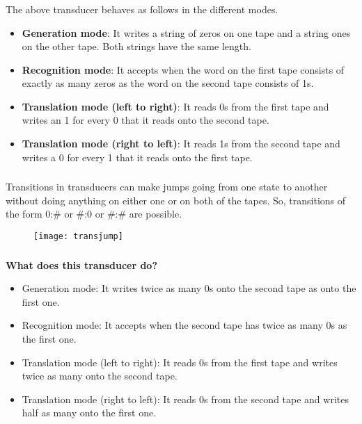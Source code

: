 \begin{frame}

	\frametitle{\insertsection}
	\framesubtitle{\insertsubsection}
	
	The above transducer behaves as follows in the different modes.
	
	\begin{itemize}
		\item \textbf{Generation mode}: It writes a string of zeros on one tape and a string ones on the other tape. Both strings have the same length.
		\item \textbf{Recognition mode}: It accepts when the word on the first tape consists of exactly as many zeros as the word on the second tape consists of 1s.
		\item \textbf{Translation mode (left to right)}: It reads 0s from the first tape and writes an 1 for every 0 that it reads onto the second tape.
		\item \textbf{Translation mode (right to left)}: It reads 1s from the second tape and writes a 0 for every 1 that it reads onto the first tape.
	\end{itemize}

\end{frame}

\begin{frame}

	\frametitle{\insertsection}
	\framesubtitle{\insertsubsection}
	
	Transitions in transducers can make jumps going from one state to another without doing anything on either one or on both of the tapes. 
	So, transitions of the form 0:\# or \#:0 or \#:\# are possible.
	
	\begin{figure}
		\texttt{[image: transjump]}
	\end{figure}

\end{frame}


\begin{frame}

	\frametitle{\insertsection}
	\framesubtitle{\insertsubsection}
	
	\textbf{What does this transducer do?}
	
	\begin{itemize}
		\item Generation mode: It writes twice as many 0s onto the second tape as onto the first one.
		\item Recognition mode: It accepts when the second tape has twice as many 0s as the first one.
		\item Translation mode (left to right): It reads 0s from the first tape and writes twice as many onto the second tape.
		\item Translation mode (right to left): It reads 0s from the second tape and writes half as many onto the first one.
	\end{itemize}
	
\end{frame}


